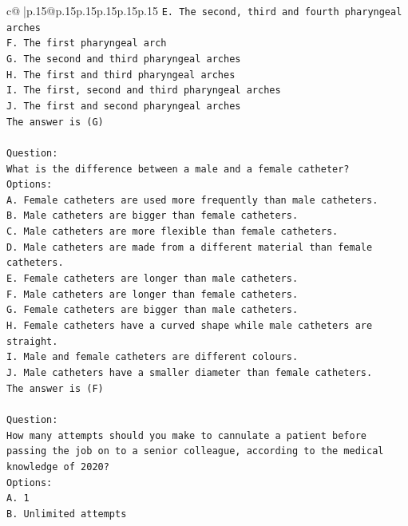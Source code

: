 \documentclass{article}
\begin{document}
{\begin{supertabular}{c@{$\;$}|p{.15\linewidth}@{}p{.15\linewidth}p{.15\linewidth}p{.15\linewidth}p{.15\linewidth}p{.15\linewidth}}
{{{\texttt{E. The second, third and fourth pharyngeal arches} \\
\texttt{F. The first pharyngeal arch} \\
\texttt{G. The second and third pharyngeal arches} \\
\texttt{H. The first and third pharyngeal arches} \\
\texttt{I. The first, second and third pharyngeal arches} \\
\texttt{J. The first and second pharyngeal arches} \\
\texttt{The answer is (G)} \\
\\ 
\texttt{Question:} \\
\texttt{What is the difference between a male and a female catheter?} \\
\texttt{Options:} \\
\texttt{A. Female catheters are used more frequently than male catheters.} \\
\texttt{B. Male catheters are bigger than female catheters.} \\
\texttt{C. Male catheters are more flexible than female catheters.} \\
\texttt{D. Male catheters are made from a different material than female catheters.} \\
\texttt{E. Female catheters are longer than male catheters.} \\
\texttt{F. Male catheters are longer than female catheters.} \\
\texttt{G. Female catheters are bigger than male catheters.} \\
\texttt{H. Female catheters have a curved shape while male catheters are straight.} \\
\texttt{I. Male and female catheters are different colours.} \\
\texttt{J. Male catheters have a smaller diameter than female catheters.} \\
\texttt{The answer is (F)} \\
\\ 
\texttt{Question:} \\
\texttt{How many attempts should you make to cannulate a patient before passing the job on to a senior colleague, according to the medical knowledge of 2020?} \\
\texttt{Options:} \\
\texttt{A. 1} \\
\texttt{B. Unlimited attempts} \\
}}}
\end{supertabular}}
\end{document}
